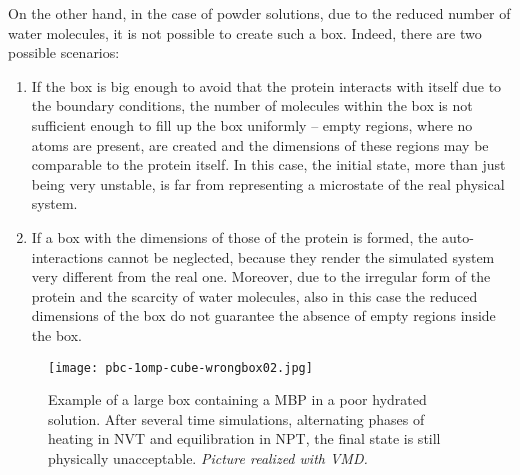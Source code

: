 On the other hand, in the case of powder solutions, due to the reduced number of water molecules, it is not possible to create such a box. Indeed, there are two possible scenarios:
\begin{enumerate}
\item If the box is big enough to avoid that the protein interacts with itself due to the boundary conditions, the number of molecules within the box is not sufficient enough to fill up the box uniformly – empty regions, where no atoms are present, are created and the dimensions of these regions may be comparable to the protein itself. In this case, the initial state, more than just being very unstable, is far from representing a microstate of the real physical system.
\item If a box with the dimensions of those of the protein is formed, the auto-interactions cannot be neglected, because they render the simulated system very different from the real one. Moreover, due to the irregular form of the protein and the scarcity of water molecules, also in this case the reduced dimensions of the box do not guarantee the absence of empty regions inside the box.
\end{enumerate}

\begin{figure}[H]
\centering
\begin{minipage}[t]{\textwidth}
	\centering
    \texttt{[image: pbc-1omp-cube-wrongbox02.jpg]}
    
    \footnotesize{\caption{Example of a large box containing a MBP in a poor hydrated solution. After several time simulations, alternating phases of heating in NVT and equilibration in NPT, the final state is still physically unacceptable. \textit{Picture realized with VMD.}}
    \label{fig:wrong-hydr}
    }
\end{minipage} 
\end{figure}

